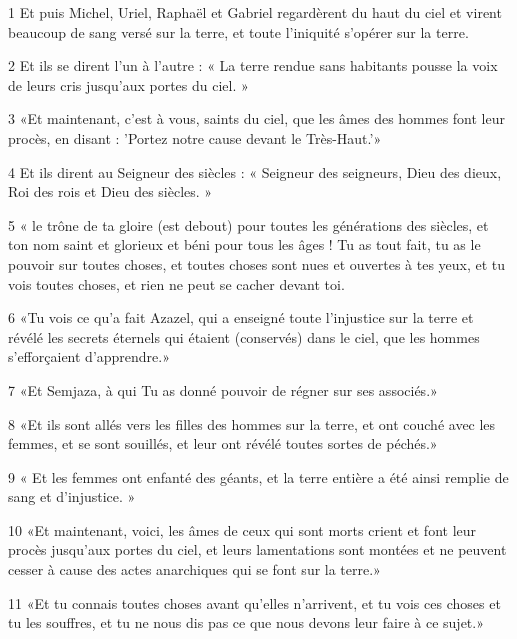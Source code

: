 \par 1 Et puis Michel, Uriel, Raphaël et Gabriel regardèrent du haut du ciel et virent beaucoup de sang versé sur la terre, et toute l'iniquité s'opérer sur la terre.
\par 2 Et ils se dirent l'un à l'autre : « La terre rendue sans habitants pousse la voix de leurs cris jusqu'aux portes du ciel. »
\par 3 «Et maintenant, c'est à vous, saints du ciel, que les âmes des hommes font leur procès, en disant : 'Portez notre cause devant le Très-Haut.'»
\par 4 Et ils dirent au Seigneur des siècles : « Seigneur des seigneurs, Dieu des dieux, Roi des rois et Dieu des siècles. »
\par 5 « le trône de ta gloire (est debout) pour toutes les générations des siècles, et ton nom saint et glorieux et béni pour tous les âges ! Tu as tout fait, tu as le pouvoir sur toutes choses, et toutes choses sont nues et ouvertes à tes yeux, et tu vois toutes choses, et rien ne peut se cacher devant toi.
\par 6 «Tu vois ce qu'a fait Azazel, qui a enseigné toute l'injustice sur la terre et révélé les secrets éternels qui étaient (conservés) dans le ciel, que les hommes s'efforçaient d'apprendre.»
\par 7 «Et Semjaza, à qui Tu as donné pouvoir de régner sur ses associés.»
\par 8 «Et ils sont allés vers les filles des hommes sur la terre, et ont couché avec les femmes, et se sont souillés, et leur ont révélé toutes sortes de péchés.»
\par 9 « Et les femmes ont enfanté des géants, et la terre entière a été ainsi remplie de sang et d'injustice. »
\par 10 «Et maintenant, voici, les âmes de ceux qui sont morts crient et font leur procès jusqu'aux portes du ciel, et leurs lamentations sont montées et ne peuvent cesser à cause des actes anarchiques qui se font sur la terre.»
\par 11 «Et tu connais toutes choses avant qu'elles n'arrivent, et tu vois ces choses et tu les souffres, et tu ne nous dis pas ce que nous devons leur faire à ce sujet.»


